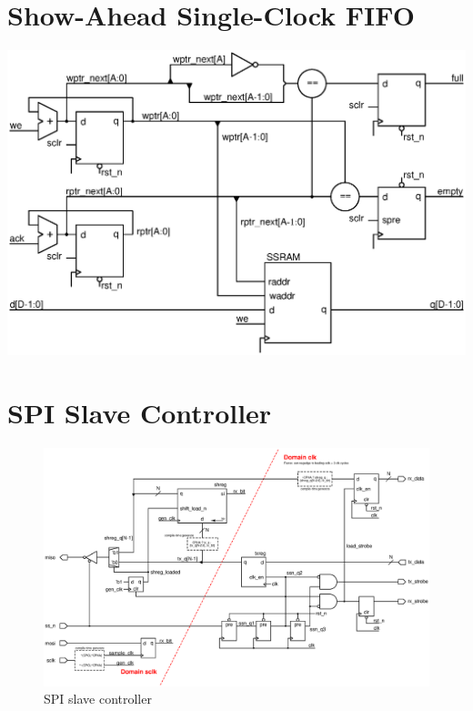 \documentclass[]{article}
\begin{document}
\clearpage
\section{Show-Ahead Single-Clock FIFO}\label{apx:fifo}

\begin{center}
    \includegraphics[width=.7\linewidth]{gfx/fifo.eps}
    \label{fig:fifo}
\end{center}

\section{SPI Slave Controller}\label{apx:spi}

\begin{figure}[h!]
    \centering
    \includegraphics[width=\linewidth]{gfx/spi_slave.eps}
    \caption{SPI slave controller}
    \label{fig:spi_slave}
\end{figure}
\end{document}
